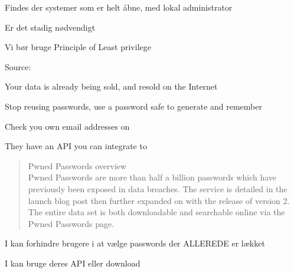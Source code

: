 \documentclass[Screen16to9,17pt]{foils}
\begin{document}


\begin{list2}
\item Findes der systemer som er helt åbne, med lokal administrator
\item Er det stadig nødvendigt
\item Vi bør bruge Principle of Least privilege
\end{list2}




Source:




\begin{list1}
\item Your data is already being sold, and resold on the Internet
\item Stop reusing passwords, use a password safe to generate and remember
\item Check you own email addresses on 
\end{list1}

\centerline{They have an API you can integrate to}



\begin{quote}
Pwned Passwords overview\\
Pwned Passwords are more than half a billion passwords which have previously been exposed in data breaches. The service is detailed in the launch blog post then further expanded on with the release of version 2. The entire data set is both downloadable and searchable online via the Pwned Passwords page.
\end{quote}

\begin{list1}
\item I kan forhindre brugere i at vælge passwords der ALLEREDE er lækket
\item I kan bruge deres API eller download\\
{\footnotesize{}}
\end{list1}
\end{document}
